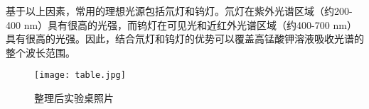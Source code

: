 \documentclass[dvipsnames, svgnames,a4paper,11pt]{article}
\begin{document}
	基于以上因素，常用的理想光源包括氘灯和钨灯。氘灯在紫外光谱区域（约200-400 nm）具有很高的光强，而钨灯在可见光和近红外光谱区域（约400-700 nm）具有很高的光强。因此，结合氘灯和钨灯的优势可以覆盖高锰酸钾溶液吸收光谱的整个波长范围。
	
	
	\begin{figure}[htbp]
		\centering
		\texttt{[image: table.jpg]}
		\caption{整理后实验桌照片}
		\label{fig:table}
	\end{figure}
	
	
	
	
	
	
	
	
%
%

%		
%		
%		
%		
\end{document}
